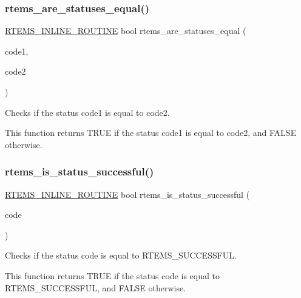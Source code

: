 \subsubsection{\texorpdfstring{rtems\_are\_statuses\_equal()}{rtems\_are\_statuses\_equal()}}
{\footnotesize\ttfamily \mbox{\hyperlink{group__RTEMSScoreBaseDefs_gac216239df231d5dbd15e3520b0b9313f}{R\+T\+E\+M\+S\+\_\+\+I\+N\+L\+I\+N\+E\+\_\+\+R\+O\+U\+T\+I\+NE}} bool rtems\+\_\+are\+\_\+statuses\+\_\+equal (\begin{DoxyParamCaption}\item[{\mbox{\hyperlink{group__ClassicStatus_ga545d41846817eaba6143d52ee4d9e9fe}{rtems\+\_\+status\+\_\+code}}}]{code1,  }\item[{\mbox{\hyperlink{group__ClassicStatus_ga545d41846817eaba6143d52ee4d9e9fe}{rtems\+\_\+status\+\_\+code}}}]{code2 }\end{DoxyParamCaption})}



Checks if the status code1 is equal to code2. 

This function returns T\+R\+UE if the status code1 is equal to code2, and F\+A\+L\+SE otherwise. \mbox{\label{group__ClassicStatus_ga66b6a30382adff21abd134ac07c9082d}} 
\subsubsection{\texorpdfstring{rtems\_is\_status\_successful()}{rtems\_is\_status\_successful()}}
{\footnotesize\ttfamily \mbox{\hyperlink{group__RTEMSScoreBaseDefs_gac216239df231d5dbd15e3520b0b9313f}{R\+T\+E\+M\+S\+\_\+\+I\+N\+L\+I\+N\+E\+\_\+\+R\+O\+U\+T\+I\+NE}} bool rtems\+\_\+is\+\_\+status\+\_\+successful (\begin{DoxyParamCaption}\item[{\mbox{\hyperlink{group__ClassicStatus_ga545d41846817eaba6143d52ee4d9e9fe}{rtems\+\_\+status\+\_\+code}}}]{code }\end{DoxyParamCaption})}



Checks if the status code is equal to R\+T\+E\+M\+S\+\_\+\+S\+U\+C\+C\+E\+S\+S\+F\+UL. 

This function returns T\+R\+UE if the status code is equal to R\+T\+E\+M\+S\+\_\+\+S\+U\+C\+C\+E\+S\+S\+F\+UL, and F\+A\+L\+SE otherwise. \mbox{\label{group__ClassicStatus_ga79ad1aab94c60408607b3d0cd36a3b24}} 
